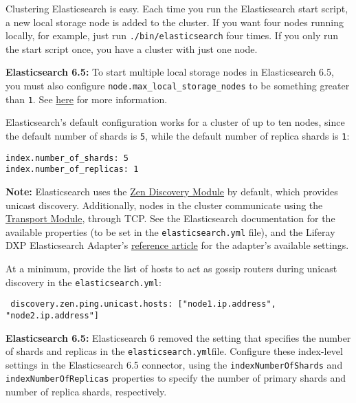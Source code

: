 Clustering Elasticsearch is easy. Each time you run the Elasticsearch
start script, a new local storage node is added to the cluster. If you
want four nodes running locally, for example, just run
\texttt{./bin/elasticsearch} four times. If you only run the start
script once, you have a cluster with just one node.

\noindent\hrulefill

\textbf{Elasticsearch 6.5:} To start multiple local storage nodes in
Elasticsearch 6.5, you must also configure
\texttt{node.max\_local\_storage\_nodes} to be something greater than
\texttt{1}. See
\href{https://www.elastic.co/guide/en/elasticsearch/reference/6.5/modules-node.html\#max-local-storage-nodes}{here}
for more information.

\noindent\hrulefill

Elasticsearch's default configuration works for a cluster of up to ten
nodes, since the default number of shards is \texttt{5}, while the
default number of replica shards is \texttt{1}:

\begin{verbatim}
index.number_of_shards: 5
index.number_of_replicas: 1
\end{verbatim}

\noindent\hrulefill

\textbf{Note:} Elasticsearch uses the
\href{https://www.elastic.co/guide/en/elasticsearch/reference/2.4/modules-discovery-zen.html}{Zen
Discovery Module} by default, which provides unicast discovery.
Additionally, nodes in the cluster communicate using the
\href{https://www.elastic.co/guide/en/elasticsearch/reference/2.4/modules-transport.html}{Transport
Module}, through TCP. See the Elasticsearch documentation for the
available properties (to be set in the \texttt{elasticsearch.yml} file),
and the Liferay DXP Elasticsearch Adapter's
\href{/docs/7-0/deploy/-/knowledge_base/d/elasticsearch-settings}{reference
article} for the adapter's available settings.

At a minimum, provide the list of hosts to act as gossip routers during
unicast discovery in the \texttt{elasticsearch.yml}:

\begin{verbatim}
 discovery.zen.ping.unicast.hosts: ["node1.ip.address", "node2.ip.address"]
\end{verbatim}

\noindent\hrulefill

\noindent\hrulefill

\textbf{Elasticsearch 6.5:} Elasticsearch 6 removed the setting that
specifies the number of shards and replicas in the
\texttt{elasticsearch.yml}file. Configure these index-level settings in
the Elasticsearch 6.5 connector, using the \texttt{indexNumberOfShards}
and \texttt{indexNumberOfReplicas} properties to specify the number of
primary shards and number of replica shards, respectively.

